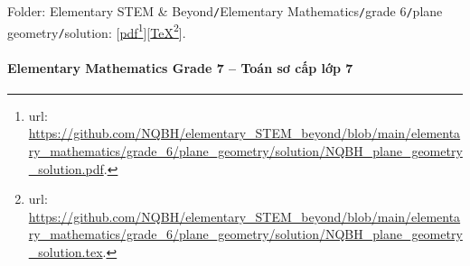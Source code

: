 \documentclass[12pt]{article}
\begin{document}
\begin{itemize}
\begin{itemize}
		Folder: {\sf Elementary STEM \& Beyond{\tt/}Elementary Mathematics{\tt/}grade 6{\tt/}plane geometry{\tt/}solution}: [\href{https://github.com/NQBH/elementary_STEM_beyond/blob/main/elementary_mathematics/grade_6/plane_geometry/solution/NQBH_plane_geometry_solution.pdf}{pdf}\footnote{{\sc url}: \url{https://github.com/NQBH/elementary_STEM_beyond/blob/main/elementary_mathematics/grade_6/plane_geometry/solution/NQBH_plane_geometry_solution.pdf}.}][\href{https://github.com/NQBH/elementary_STEM_beyond/blob/main/elementary_mathematics/grade_6/plane_geometry/solution/NQBH_plane_geometry_solution.tex}{\TeX}\footnote{{\sc url}: \url{https://github.com/NQBH/elementary_STEM_beyond/blob/main/elementary_mathematics/grade_6/plane_geometry/solution/NQBH_plane_geometry_solution.tex}.}].
	\end{itemize}
\end{itemize}

\paragraph{Elementary Mathematics Grade 7 -- Toán sơ cấp lớp 7}
\end{document}
